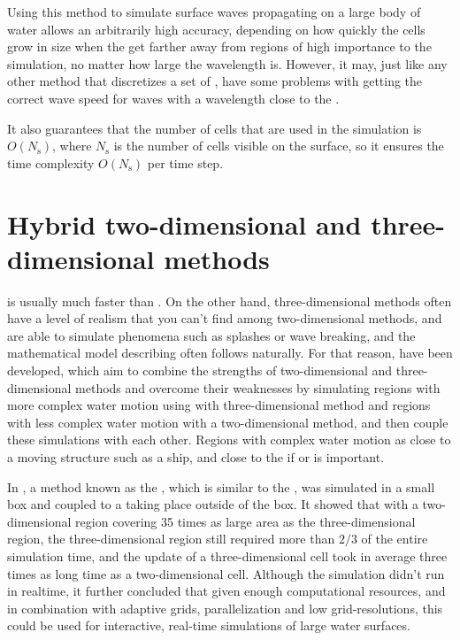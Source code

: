 Using this method to simulate surface waves propagating on a large body of water allows an arbitrarily high accuracy, depending on how quickly the cells grow in size when the get farther away from regions of high importance to the simulation, no matter how large the wavelength is. However, it may, just like any other method that discretizes a set of \PDEs, have some problems with getting the correct wave speed for waves with a wavelength close to the .

It also guarantees that the number of cells that are used in the simulation is $O(N_{\text{s}})$, where $N_{\text{s}}$ is the number of cells visible on the surface, so it ensures the time complexity $O(N_{\text{s}})$ per time step.

\section{Hybrid two-dimensional and three-dimensional methods}

 is usually much faster than . On the other hand, three-dimensional methods often have a level of realism that you can't find among two-dimensional methods, and are able to simulate phenomena such as splashes or wave breaking, and the mathematical model describing \FSI often follows naturally. For that reason,  have been developed, which aim to combine the strengths of two-dimensional and three-dimensional methods and overcome their weaknesses by simulating regions with more complex water motion using with three-dimensional method and regions with less complex water motion with a two-dimensional method, and then couple these simulations with each other. Regions with complex water motion as close to a moving structure such as a ship, and close to the \shoreline if  or  is important.

In \citep{Thurey2006}, a method known as the , which is similar to the \FVM, was simulated in a small box and coupled to a \SWS taking place outside of the box. It showed that with a two-dimensional region covering 35 times as large area as the three-dimensional region, the three-dimensional region still required more than $2/3$ of the entire simulation time, and the update of a three-dimensional cell took in average three times as long time as a two-dimensional cell. Although the simulation didn't run in realtime, it further concluded that given enough computational resources, and in combination with adaptive grids, parallelization and low grid-resolutions, this could be used for interactive, real-time simulations of large water surfaces.

